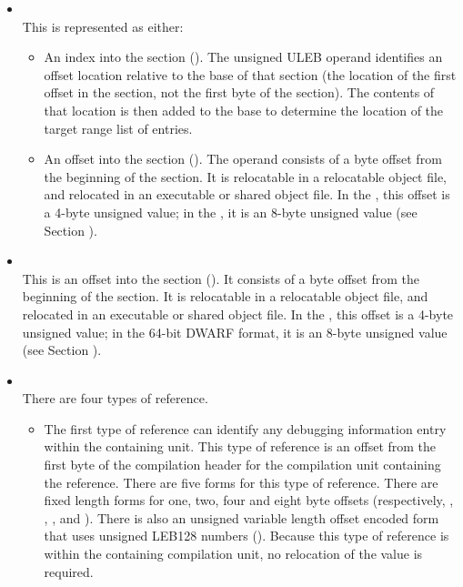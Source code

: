 \begin{itemize}
\item \CLASSrnglist \\
This is represented as either:
\begin{itemize}
\item
An index into the \dotdebugrnglists{} section (\DWFORMrnglistxTARG). 
The unsigned ULEB operand identifies an offset location 
relative to the base of that section (the location of the first offset 
in the section, not the first byte of the section). The contents of 
that location is then added to the base to determine the location of 
the target range list of entries.
\item
An offset into the \dotdebugrnglists{} section (\DWFORMsecoffset). 
The operand consists of a byte 
offset
from the beginning of the \dotdebugrnglists{} section.
It is relocatable in a relocatable object file, and
relocated in an executable or shared object file. In the 
\thirtytwobitdwarfformat, this offset is a 4-byte unsigned value;
in the \sixtyfourbitdwarfformat, it is an 8-byte unsigned value
(see Section ).
\end{itemize}

\item \CLASSrnglistsptr \\
This is an offset
into the \dotdebugrnglists{} section (\DWFORMsecoffset). 
It consists of a byte offset from the beginning of the 
\dotdebugrnglists{} section.
It is relocatable in a relocatable object file, and relocated 
in an executable or shared object file.
In the \thirtytwobitdwarfformat, this offset
is a 4-byte unsigned value; in the 64-bit DWARF
format, it is an 8-byte unsigned value (see Section
).

\item \CLASSreference \\
There are four types of reference.
\begin{itemize}
\item
The first type of reference can identify any debugging
information entry within the containing unit. 
This type of reference is an 
offset
from the first byte of the compilation
header for the compilation unit containing the reference. There
are five forms for this type of reference. There are fixed
length forms for one, two, four and eight byte offsets
(respectively,
\DWFORMrefnMARK 
\DWFORMrefoneTARG, 
\DWFORMreftwoTARG, 
\DWFORMreffourTARG,
and \DWFORMrefeightTARG). 
There is also an unsigned variable
length offset encoded form that uses 
unsigned LEB128 numbers
(\DWFORMrefudataTARG). 
Because this type of reference is within
the containing compilation unit, no relocation of the value
is required.


\end{itemize}
\end{itemize}
